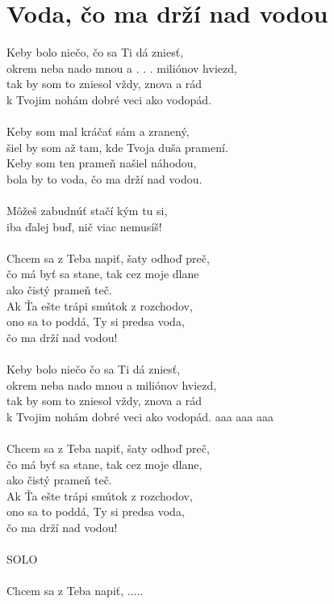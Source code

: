 \section{Voda, čo ma drží nad vodou}
Keby bolo niečo, čo sa Ti dá zniesť,\\
okrem neba nado mnou a . . . miliónov hviezd,\\
tak by som to zniesol vždy, znova a rád\\
k Tvojim nohám dobré veci ako vodopád.\\
\\
Keby som mal kráčať sám a zranený,\\
šiel by som až tam, kde Tvoja duša pramení.\\
Keby som ten prameň našiel náhodou,\\
bola by to voda, čo ma drží nad vodou.\\
\\
Môžeš zabudnúť stačí kým tu si,\\
iba ďalej buď, nič viac nemusíš!\\
\\
Chcem sa z Teba napiť, šaty odhoď preč,\\
čo má byť sa stane, tak cez moje dlane \\
ako čistý prameň teč.\\
Ak Ťa ešte trápi smútok z rozchodov,\\
ono sa to poddá, Ty si predsa voda,\\
čo ma drží nad vodou!\\
\\
Keby bolo niečo čo sa Ti dá zniesť,\\
okrem neba nado mnou a miliónov hviezd,\\
tak by som to zniesol vždy, znova a rád\\
k Tvojim nohám dobré veci ako vodopád. aaa aaa aaa\\
\\
Chcem sa z Teba napiť, šaty odhoď preč,\\
čo má byť sa stane, tak cez moje dlane,\\
ako čistý prameň teč.\\
Ak Ťa ešte trápi smútok z rozchodov,\\
ono sa to poddá, Ty si predsa voda,\\
čo ma drží nad vodou!\\
\\
SOLO\\
\\
Chcem sa z Teba napiť, .....